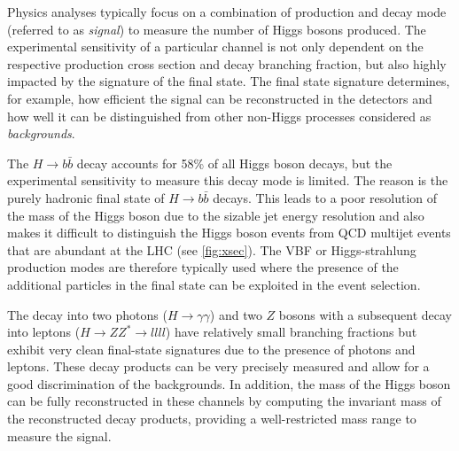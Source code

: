 Physics analyses typically focus on a combination of production and decay mode (referred to as \emph{signal}) to measure the number of Higgs bosons produced. The experimental sensitivity of a particular channel is not only dependent on the respective production cross section and decay branching fraction, but also highly impacted by the signature of the final state. The final state signature determines, for example, how efficient the signal can be reconstructed in the detectors and how well it can be distinguished from other non-Higgs processes considered as \emph{backgrounds}. 

The $H\rightarrow b\bar{b}$ decay accounts for 58\% of all Higgs boson decays, but the experimental sensitivity to measure this decay mode is limited. The reason is the purely hadronic final state of $H\rightarrow b\bar{b}$ decays. 
This leads to a poor resolution of the mass of the Higgs boson due to the sizable jet energy resolution and also makes it difficult to distinguish the Higgs boson events from QCD multijet events that are abundant at the LHC (see \cref{fig:xsec}).
The VBF or Higgs-strahlung production modes are therefore typically used where the presence of the additional particles in the final state can be exploited in the event selection.

The decay into two photons ($H \to \gamma\gamma$) and two $Z$ bosons with a subsequent decay into leptons ($H \to ZZ^* \to llll$) have relatively small branching fractions but exhibit very clean final-state signatures due to the presence of photons and leptons. These decay products can be very precisely measured and allow for a good discrimination of the backgrounds.
In addition, the mass of the Higgs boson can be fully reconstructed in these channels by computing the invariant mass of the reconstructed decay products, providing a well-restricted mass range to measure the signal.

